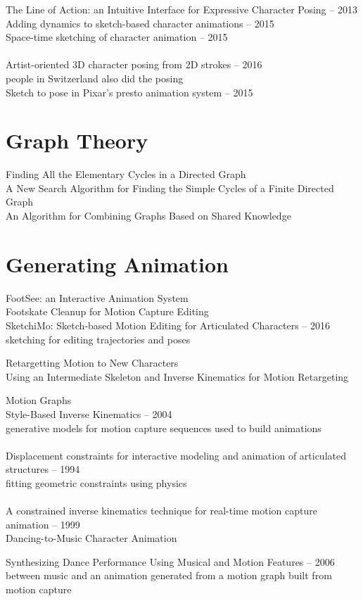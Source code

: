 The Line of Action: an Intuitive Interface for Expressive Character Posing -- 2013\\
Adding dynamics to sketch-based character animations -- 2015\\
Space-time sketching of character animation -- 2015\\
\\
Artist-oriented 3D character posing from 2D strokes -- 2016\\
people in Switzerland also did the posing \\
Sketch to pose in Pixar's presto animation system -- 2015


\section{Graph Theory}
Finding All the Elementary Cycles in a Directed Graph\\
A New Search Algorithm for Finding the Simple Cycles of a Finite Directed Graph\\
An Algorithm for Combining Graphs Based on Shared Knowledge

\section{Generating Animation}
FootSee: an Interactive Animation System\\
Footskate Cleanup for Motion Capture Editing\\
SketchiMo: Sketch-based Motion Editing for Articulated Characters -- 2016\\
sketching for editing trajectories and poses

Retargetting Motion to New Characters\\
Using an Intermediate Skeleton and Inverse Kinematics for Motion Retargeting

Motion Graphs\\
Style-Based Inverse Kinematics -- 2004\\
generative models for motion capture sequences used to build animations\\\\
Displacement constraints for interactive modeling and animation of articulated structures -- 1994\\
fitting geometric constraints using physics\\\\
A constrained inverse kinematics technique for real-time motion capture animation -- 1999\\
Dancing-to-Music Character Animation

Synthesizing Dance Performance Using Musical and Motion Features -- 2006\\
between music and an animation generated from a motion graph built from motion capture
